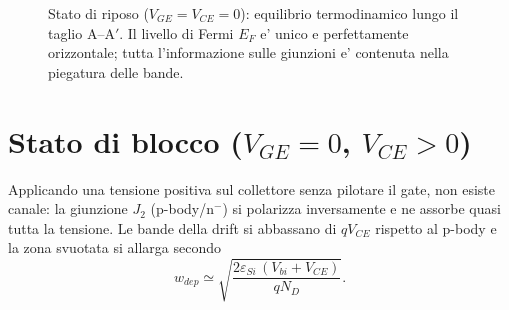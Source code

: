 \documentclass[11pt,a4paper]{article}
\newcommand{\EG}{1.12}
\begin{document}
\begin{figure}[H]
\centering
\def\EcEq{(0,0.06) (1.0,0.06) (1.2,0.22) (1.5,0.62) (1.8,0.86) (2.1,0.90)
           (3.0,0.90) (3.3,0.86) (3.7,0.66) (4.3,0.36) (4.8,0.27) (5.3,0.25)
           (8.2,0.25) (8.5,0.18) (8.9,0.12) (9.4,0.12) (9.7,0.36) (10.0,0.76)
           (10.3,0.96) (10.6,1.00) (11.0,1.00)}
\caption{Stato di riposo ($V_{GE}=V_{CE}=0$): equilibrio termodinamico lungo il
taglio A--A$'$. Il livello di Fermi $E_F$ e' unico e perfettamente orizzontale;
tutta l'informazione sulle giunzioni e' contenuta nella piegatura delle bande.}
\label{fig:eq}
\end{figure}

\section{Stato di blocco (\texorpdfstring{$V_{GE}=0$, $V_{CE}>0$}{VGE=0, VCE>0})}

Applicando una tensione positiva sul collettore senza pilotare il gate, non
esiste canale: la giunzione $J_2$ (p-body/$\mathrm{n^{-}}$) si polarizza
inversamente e ne assorbe quasi tutta la tensione. Le bande della drift si
abbassano di $qV_{CE}$ rispetto al p-body e la zona svuotata si allarga
secondo
\begin{equation}
w_{dep} \simeq \sqrt{\frac{2\varepsilon_{Si}\,(V_{bi}+V_{CE})}{q N_D}} .
\end{equation}
\end{document}
